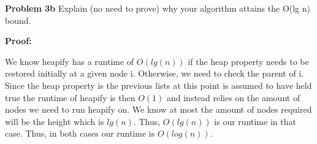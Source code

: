\documentclass[12pt]{article}
\begin{document}
\rightline{$\blacksquare$}

\par


\par
\bigskip
{\bf Problem
    3b
}
Explain (no need to prove) why your algorithm attains the O(lg n) bound.

\par
\bigskip
{\bf Proof:}
\par
We know heapify has a runtime of $O(lg(n))$ if the heap property 
needs to be restored initially at a given node i. Otherwise, 
we need to check the parent of i. Since the heap property is the 
previous lists at this point is assumed to have held true the 
runtime of heapify is then $O(1)$ and instead relies on the 
amount of nodes we need to run heapify on. We know at most 
the amount of nodes required will be the height which is $lg(n)$.
Thus, $O(lg(n))$ is our runtime in that case. Thus, in both cases 
our runtime is $O(log(n))$.\\

\rightline{$\blacksquare$}

\par
\end{document}
